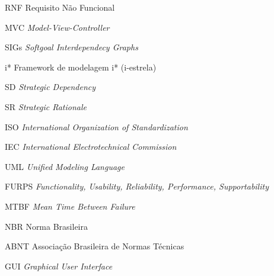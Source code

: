 \begin{siglas}
  \item[RNF] Requisito Não Funcional
  \item[MVC] \textit{Model-View-Controller}
  \item[SIGs] \textit{Softgoal Interdependecy Graphs}
  \item[i*] Framework de modelagem i* (i-estrela)
  \item[SD] \textit{Strategic Dependency}
  \item[SR] \textit{Strategic Rationale}
  \item[ISO] \textit{International Organization of Standardization}
  \item[IEC] \textit{International Electrotechnical Commission}
  \item[UML] \textit{Unified Modeling Language}
  \item[FURPS] \textit{Functionality, Usability, Reliability, Performance, Supportability}
  \item[MTBF] \textit{Mean Time Between Failure}
  \item[NBR] Norma Brasileira
  \item[ABNT] Associação Brasileira de Normas Técnicas
  \item[GUI] \textit{Graphical User Interface}
\end{siglas}
